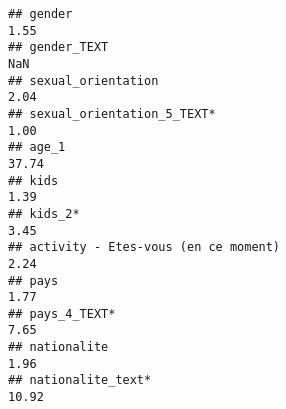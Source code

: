 \documentclass[
]{article}
\begin{document}
\begin{verbatim}
## gender                                                                                                                                                                                                                        1.55
## gender_TEXT                                                                                                                                                                                                                    NaN
## sexual_orientation                                                                                                                                                                                                            2.04
## sexual_orientation_5_TEXT*                                                                                                                                                                                                    1.00
## age_1                                                                                                                                                                                                                        37.74
## kids                                                                                                                                                                                                                          1.39
## kids_2*                                                                                                                                                                                                                       3.45
## activity - Etes-vous (en ce moment)                                                                                                                                                                                           2.24
## pays                                                                                                                                                                                                                          1.77
## pays_4_TEXT*                                                                                                                                                                                                                  7.65
## nationalite                                                                                                                                                                                                                   1.96
## nationalite_text*                                                                                                                                                                                                            10.92

\end{verbatim}
\end{document}

